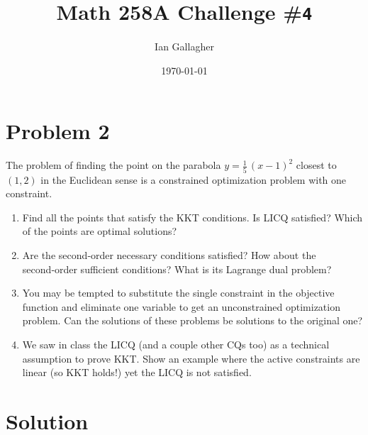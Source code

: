 \documentclass[11pt]{article}
\title{Math 258A Challenge \#\texttt{4}}
\author{Ian Gallagher}
\date{\today}
\theoremstyle{problemstyle}
\begin{document}
\maketitle

\section*{Problem 2}
The problem of finding the point on the parabola
\( y = \tfrac15\,(x-1)^2 \) closest to \( (1,2) \) in the Euclidean sense
is a constrained optimization problem with one constraint.
\begin{enumerate}[label=(\alph*)]
  \item Find all the points that satisfy the KKT conditions.
        Is LICQ satisfied?  Which of the points are optimal solutions?

  \item Are the second‑order necessary conditions satisfied?
        How about the second‑order sufficient conditions?
        What is its Lagrange dual problem?

  \item You may be tempted to substitute the single constraint in the
        objective function and eliminate one variable to get an
        unconstrained optimization problem.
        Can the solutions of these problems be solutions to the original one?

  \item We saw in class the LICQ (and a couple other CQs too)
        as a technical assumption to prove KKT.
        Show an example where the active constraints are linear
        (so KKT holds!) yet the LICQ is not satisfied.
\end{enumerate}

\section*{Solution}

\end{document}
